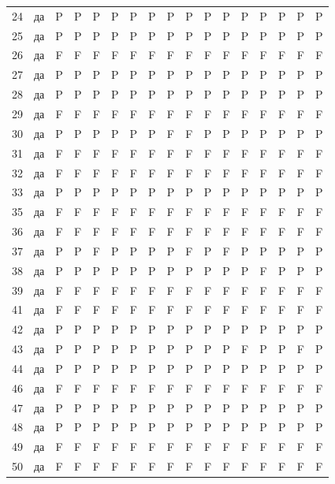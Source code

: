 \begin{table}[p]
\begin{tabular*}{\textwidth}{@{\extracolsep{\fill}}rcccccccccccccccc}
24 & да & P & P & P & P & P & P & P & P & P & P & P & P & P & P & P\\
25 & да & P & P & P & P & P & P & P & P & P & P & P & P & P & P & P\\
26 & да & F & F & F & F & F & F & F & F & F & F & F & F & F & F & F\\
27 & да & P & P & P & P & P & P & P & P & P & P & P & P & P & P & P\\
28 & да & P & P & P & P & P & P & P & P & P & P & P & P & P & P & P\\
29 & да & F & F & F & F & F & F & F & F & F & F & F & F & F & F & F\\
30 & да & P & P & P & P & P & P & F & F & P & P & P & P & P & P & P\\
31 & да & F & F & F & F & F & F & F & F & F & F & F & F & F & F & F\\
32 & да & F & F & F & F & F & F & F & F & F & F & F & F & F & F & F\\
33 & да & P & P & P & P & P & P & P & P & P & P & P & P & P & P & P\\
35 & да & F & F & F & F & F & F & F & F & F & F & F & F & F & F & F\\
36 & да & F & F & F & F & F & F & F & F & F & F & F & F & F & F & F\\
37 & да & P & P & F & P & P & P & P & F & P & F & P & P & P & P & P\\
38 & да & P & P & P & P & P & P & P & P & P & P & P & F & P & P & P\\
39 & да & F & F & F & F & F & F & F & F & F & F & F & F & F & F & F\\
41 & да & F & F & F & F & F & F & F & F & F & F & F & F & F & F & F\\
42 & да & P & P & P & P & P & P & P & P & P & P & P & P & P & P & P\\
43 & да & P & P & P & P & P & P & P & P & P & P & F & P & P & F & P\\
44 & да & P & P & P & P & P & P & P & P & P & P & P & P & P & P & P\\
46 & да & F & F & F & F & F & F & F & F & F & F & F & F & F & F & F\\
47 & да & P & P & P & P & P & P & P & P & P & P & P & P & P & P & P\\
48 & да & P & P & P & P & P & P & P & P & P & P & P & P & P & P & P\\
49 & да & F & F & F & F & F & F & F & F & F & F & F & F & F & F & F\\
50 & да & F & F & F & F & F & F & F & F & F & F & F & F & F & F & F\\
\bottomrule\end{tabular*}\end{table}
\clearpage


